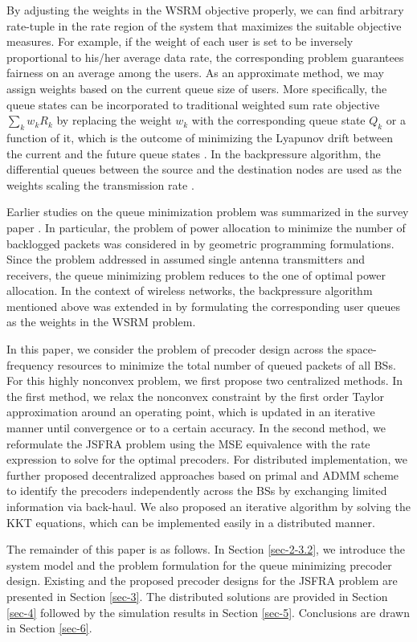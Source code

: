 By adjusting the weights in the \ac{WSRM} objective properly, we can find arbitrary rate-tuple in the rate region of the system that maximizes the suitable objective measures. For example, if the weight of each user is set to be inversely proportional to his/her average data rate, the corresponding problem guarantees fairness on an average among the users. As an approximate method, we may assign weights based on the current queue size of users. More specifically, the queue states can be incorporated to traditional weighted sum rate objective $\sum_k w_k R_k$ by replacing the weight $w_k$ with the corresponding queue state $Q_k$ or a function of it,  which is the outcome of minimizing the Lyapunov drift between the current and the future queue states \cite{tassiulas,neely2010stochastic}. In the backpressure algorithm, the differential queues between the source and the destination nodes are used as the weights scaling the transmission rate \cite{georgiadis2006resource}.

Earlier studies on the queue minimization problem was summarized in the survey paper \cite{berry2004cross}. In particular, the problem of power allocation to minimize the number of backlogged packets was considered in \cite{qps_cioffi} by geometric programming formulations. Since the problem addressed in \cite{qps_cioffi} assumed single antenna transmitters and receivers, the queue minimizing problem reduces to the one of optimal power allocation. In the context of wireless networks, the backpressure algorithm mentioned above was extended in \cite{weeraddana2011resource} by formulating the corresponding user queues as the weights in the \ac{WSRM} problem.

In this paper, we consider the problem of precoder design across the space-frequency resources to minimize the total number of queued packets of all \acp{BS}. For this highly nonconvex problem, we first propose two centralized methods. In the first method, we relax the nonconvex constraint by the first order Taylor approximation around an operating point, which is updated in an iterative manner until convergence or to a certain accuracy. In the second method, we reformulate the \ac{JSFRA} problem using the \ac{MSE} equivalence with the rate expression to solve for the optimal precoders. For distributed implementation, we further proposed decentralized approaches based on primal and \ac{ADMM} scheme to identify the precoders independently across the \acp{BS} by exchanging limited information via back-haul. We also proposed an iterative algorithm by solving the \ac{KKT} equations, which can be implemented easily in a distributed manner.

The remainder of this paper is as follows. In Section \ref{sec-2-3.2}, we introduce the system model and the problem formulation for the queue minimizing precoder design. Existing and the proposed precoder designs for the \ac{JSFRA} problem are presented in Section \ref{sec-3}. The distributed solutions are provided in Section \ref{sec-4} followed by the simulation results in Section \ref{sec-5}. Conclusions are drawn in Section \ref{sec-6}.